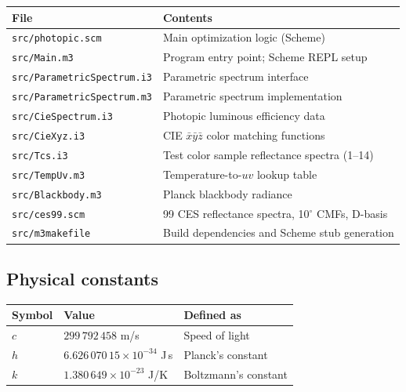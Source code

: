 \documentclass[11pt]{article}
\newcommand{\file}[1]{\texttt{#1}}
\begin{document}
\begin{center}
\begin{tabular}{@{}ll@{}}
\toprule
File & Contents \\
\midrule
\file{src/photopic.scm}          & Main optimization logic (Scheme) \\
\file{src/Main.m3}               & Program entry point; Scheme REPL setup \\
\file{src/ParametricSpectrum.i3}  & Parametric spectrum interface \\
\file{src/ParametricSpectrum.m3}  & Parametric spectrum implementation \\
\file{src/CieSpectrum.i3}         & Photopic luminous efficiency data \\
\file{src/CieXyz.i3}              & CIE $\bar{x}\bar{y}\bar{z}$ color matching functions \\
\file{src/Tcs.i3}                 & Test color sample reflectance spectra (1--14) \\
\file{src/TempUv.m3}              & Temperature-to-$uv$ lookup table \\
\file{src/Blackbody.m3}           & Planck blackbody radiance \\
\file{src/ces99.scm}              & 99 CES reflectance spectra, 10$^\circ$ CMFs, D-basis \\
\file{src/m3makefile}             & Build dependencies and Scheme stub generation \\
\bottomrule
\end{tabular}
\end{center}

\subsection{Physical constants}

\begin{center}
\begin{tabular}{@{}lll@{}}
\toprule
Symbol & Value & Defined as \\
\midrule
$c$  & $299\,792\,458$ m/s           & Speed of light \\
$h$  & $6.626\,070\,15 \times 10^{-34}$ J\,s & Planck's constant \\
$k$  & $1.380\,649 \times 10^{-23}$ J/K       & Boltzmann's constant \\
\bottomrule
\end{tabular}
\end{center}
\end{document}
